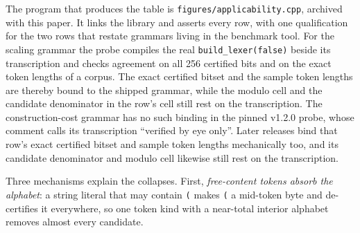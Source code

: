 \documentclass[11pt,a4paper]{article}
\theoremstyle{definition}
\theoremstyle{plain}
\newcommand{\code}[1]{\texttt{#1}}
\begin{document}
\begin{table}[!t]
\caption{Certified bytes by token set, exactly and modulo the discarded set $I$. Three mechanisms explain the collapses
in the middle column. Free-content tokens absorb the alphabet, run tokens de-certify their own bytes, and a multi-byte
token de-certifies the bytes it continues past. Discarding undoes only the second. A severed whitespace run leaves two
whitespace runs and both are deleted, so the run-token obstruction alone disappears, while a string, comment or kept
token that also admits the byte still excludes it. The other two mechanisms survive. A state inside a string literal or
a block comment accepts nothing, so no cut there ends the left chunk on a complete discarded token. The continuation
bytes of a kept multi-byte token stay lost, because the token such a cut severs is kept and cannot vanish from the
streams. Both columns are asserted for every row by \code{figures/applicability.cpp}, the relaxed column under the
state-equality condition, the shipped coalesced test and the exact decision of Section~\ref{sec:exact} alike. Four rows
are also confirmed by splitting a corpus. The two benchmark-grammar rows are asserted against transcriptions whose
provenance the text details.}
\label{tab:applicability}
\end{table}

The program that produces the table is \code{figures/applicability.cpp}, archived with this paper. It links the library
and asserts every row, with one qualification for the two rows that restate grammars living in the benchmark tool. For
the scaling grammar the probe compiles the real \code{build\_lexer(false)} beside its transcription and checks agreement
on all 256 certified bits and on the exact token lengths of a corpus. The exact certified bitset and the sample token
lengths are thereby bound to the shipped grammar, while the modulo cell and the candidate denominator in the row's cell
still rest on the transcription. The construction-cost grammar has no such binding in the pinned v1.2.0 probe, whose
comment calls its transcription ``verified by eye only''. Later releases bind that row's exact certified bitset and
sample token lengths mechanically too, and its candidate denominator and modulo cell likewise still rest on the
transcription.

Three mechanisms explain the collapses. First, \emph{free-content tokens absorb the alphabet}: a string literal that may
contain \code{(} makes \code{(} a mid-token byte and de-certifies it everywhere, so one token kind with a near-total
interior alphabet removes almost every candidate.
\end{document}
